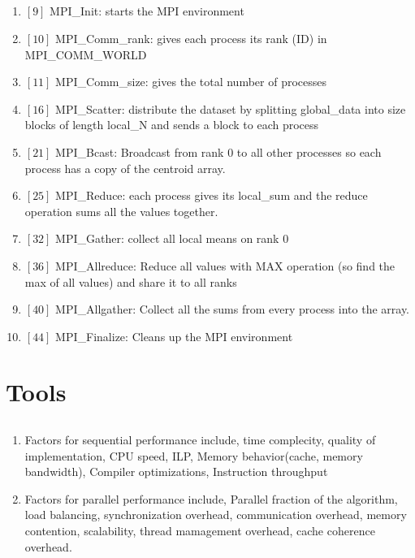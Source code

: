 \documentclass[12pt]{article}
\begin{document}
\subsection{}
\begin{enumerate}
	\item $[9]$ MPI\_Init: starts the MPI environment
	\item $[10]$ MPI\_Comm\_rank:  gives each process its rank (ID) in MPI\_COMM\_WORLD
	\item $[11]$ MPI\_Comm\_size: gives the total number of processes
	\item $[16]$ MPI\_Scatter: distribute the dataset by splitting global\_data into size blocks of length local\_N and sends a block to each process
	\item $[21]$ MPI\_Bcast: Broadcast from rank 0 to all other processes so each process has a copy of the centroid array.
	\item $[25]$ MPI\_Reduce: each process gives its local\_sum and the reduce operation sums all the values together.
	\item $[32]$ MPI\_Gather: collect all local means on rank 0
	\item $[36]$ MPI\_Allreduce: Reduce all values with MAX operation (so find the max of all values) and share it to all ranks
	\item $[40]$ MPI\_Allgather: Collect all the sums from every process into the array.
	
	\item $[44]$ MPI\_Finalize: Cleans up the MPI environment
\end{enumerate}

\section{}

\section{Tools}
\subsection{}
\begin{enumerate}
	\item Factors for sequential performance include, time complecity, quality of implementation, CPU speed, ILP, Memory behavior(cache, memory bandwidth), Compiler optimizations, Instruction throughput
	\item Factors for parallel performance include, Parallel fraction of the algorithm, load balancing, synchronization overhead, communication overhead, memory contention, scalability, thread mamagement overhead, cache coherence overhead.
\end{enumerate}
\end{document}
